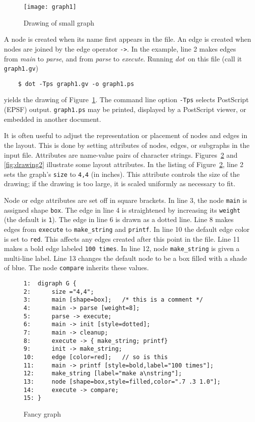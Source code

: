\documentclass[11pt]{article}
\def\dot{{\it dot}}
\begin{document}
{\begin{figure}[p]
	\centerline {
		\texttt{[image: graph1]}
	}
    \caption{Drawing of small graph}
    \label{fig:drawing1}
\end{figure}

A node is created when its name first appears in the file.
An edge is created when nodes are joined by the edge operator \verb"->".
In the example, line 2 makes edges from {\it main} to {\it parse},
and from {\it parse} to {\it execute}.
Running \dot\ on this file (call it \verb"graph1.gv")
\begin{verbatim}
    $ dot -Tps graph1.gv -o graph1.ps
\end{verbatim}
yields the drawing of Figure~\ref{fig:drawing1}.
The command line option \verb"-Tps" selects PostScript (EPSF) output. 
\verb"graph1.ps" may be printed, displayed by a PostScript viewer,
or embedded in another document.

It is often useful to adjust the representation or placement of nodes
and edges in the layout.  This is done by setting attributes of nodes,
edges, or subgraphs in the input file.
Attributes are name-value pairs of character strings.
Figures~\ref{fig:graph2} and \ref{fig:drawing2} illustrate
some layout attributes.  In the listing of Figure~\ref{fig:graph2},
line 2 sets the graph's {\tt size} to {\tt 4,4}
(in inches).
This attribute controls the size of the drawing; if the drawing is
too large, it is scaled uniformly as necessary to fit.

Node or edge attributes are set off in square brackets.
In line 3, the node \verb"main" is assigned shape \verb"box".
The edge in line 4 is straightened by increasing its 
\verb"weight" (the default is \verb"1").
The edge in line 6 is drawn as a dotted line.
Line 8 makes edges from {\tt execute} to {\tt make\_string} and {\tt printf}.
In line 10 the default edge color is set to \verb"red".
This affects any edges created after this point in the file.
Line 11 makes a bold edge labeled {\tt 100 times}.
In line 12, node \verb"make_string" is given a multi-line label.
Line 13 changes the default node to be a box filled with a shade of blue.
The node {\tt compare} inherits these values.

\begin{figure}[p]
\begin{verbatim}
1:  digraph G {
2:      size ="4,4";
3:      main [shape=box];   /* this is a comment */
4:      main -> parse [weight=8];
5:      parse -> execute;
6:      main -> init [style=dotted];
7:      main -> cleanup;
8:      execute -> { make_string; printf}
9:      init -> make_string;
10:     edge [color=red];   // so is this
11:     main -> printf [style=bold,label="100 times"];
12:     make_string [label="make a\nstring"];
13:     node [shape=box,style=filled,color=".7 .3 1.0"];
14:     execute -> compare;
15: }
\end{verbatim}
\caption{Fancy graph}
\label{fig:graph2}
\end{figure}

}
\end{document}
